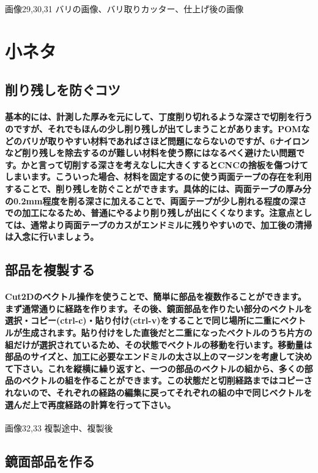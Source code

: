 \documentclass[b5paper, 9pt, twocolumn, titlepage,openany]{jsbook}%
\begin{document}
画像29,30,31 バリの画像、バリ取りカッター、仕上げ後の画像

\section{小ネタ}
\subsection{削り残しを防ぐコツ}
\paragraph{基本的には、計測した厚みを元にして、丁度削り切れるような深さで切削を行うのですが、それでもほんの少し削り残しが出てしまうことがあります。POMなどのバリが取りやすい材料であればさほど問題にならないのですが、6ナイロンなど削り残しを除去するのが難しい材料を使う際にはなるべく避けたい問題です。かと言って切削する深さを考えなしに大きくするとCNCの捨板を傷つけてしまいます。こういった場合、材料を固定するのに使う両面テープの存在を利用することで、削り残しを防ぐことができます。具体的には、両面テープの厚み分の0.2mm程度を削る深さに加えることで、両面テープが少し削れる程度の深さでの加工になるため、普通にやるより削り残しが出にくくなります。注意点としては、通常より両面テープのカスがエンドミルに残りやすいので、加工後の清掃は入念に行いましょう。}

\subsection{部品を複製する}
\paragraph{Cut2Dのベクトル操作を使うことで、簡単に部品を複数作ることができます。まず通常通りに経路を作ります。その後、鏡面部品を作りたい部分のベクトルを選択・コピー(ctrl-c)・貼り付け(ctrl-v)をすることで同じ場所に二重にベクトルが生成されます。貼り付けをした直後だと二重になったベクトルのうち片方の組だけが選択されているため、その状態でベクトルの移動を行います。移動量は部品のサイズと、加工に必要なエンドミルの太さ以上のマージンを考慮して決めて下さい。これを縦横に繰り返すと、一つの部品のベクトルの組から、多くの部品のベクトルの組を作ることができます。この状態だと切削経路まではコピーされないので、それぞれの経路の編集に戻ってそれぞれの組の中で同じベクトルを選んだ上で再度経路の計算を行って下さい。}

画像32,33 複製途中、複製後

\subsection{鏡面部品を作る}
\end{document}
